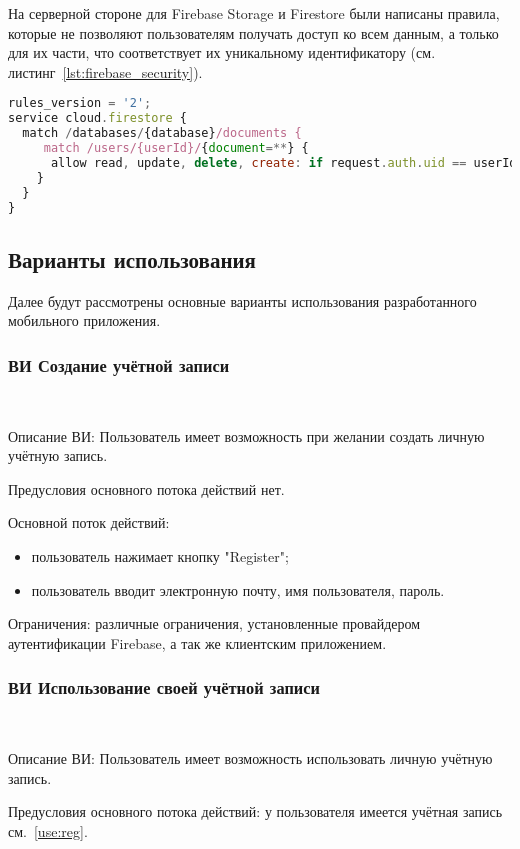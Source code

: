На серверной стороне для Firebase Storage и Firestore были написаны правила, которые не позволяют пользователям получать доступ ко всем данным, а только для их части, что соответствует их уникальному идентификатору (см. листинг~\ref{lst:firebase_security}).

\begin{lstlisting}[language=Javascript,label={lst:firebase_security},caption={Правила Firestore}]
rules_version = '2';
service cloud.firestore {
  match /databases/{database}/documents {
     match /users/{userId}/{document=**} {
      allow read, update, delete, create: if request.auth.uid == userId;
    }
  }
}
\end{lstlisting}


\subsection{Варианты использования}
Далее будут рассмотрены основные варианты использования разработанного мобильного приложения.

\subsubsection{ВИ Создание учётной записи}~\par
\label{use:reg}
Описание ВИ: Пользователь имеет возможность при желании создать личную учётную запись.
 
Предусловия основного потока действий нет.
 
Основной поток действий:
\begin{itemize}
   \item пользователь нажимает кнопку "Register";
   \item пользователь вводит электронную почту, имя пользователя, пароль.
\end{itemize}
 
Ограничения: различные ограничения, установленные провайдером аутентификации Firebase, а так же клиентским приложением.
 
\subsubsection{ВИ Использование своей учётной записи}~\par
Описание ВИ: Пользователь имеет возможность использовать личную учётную запись.
 
Предусловия основного потока действий: у пользователя имеется учётная запись см.~\ref{use:reg}.
 

